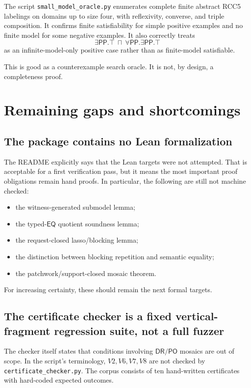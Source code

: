 \documentclass[11pt]{article}
\newcommand{\PP}{\mathsf{PP}}
\newcommand{\PO}{\mathsf{PO}}
\newcommand{\DR}{\mathsf{DR}}
\newcommand{\EQ}{\mathsf{EQ}}
\newcommand{\true}{\top}
\begin{document}
The script \texttt{small\_model\_oracle.py} enumerates complete finite abstract RCC5 labelings on domains up to size four, with reflexivity, converse, and triple composition.  It confirms finite satisfiability for simple positive examples and no finite model for some negative examples.  It also correctly treats
\[
\exists\PP.\true\ \sqcap\ \forall\PP.\exists\PP.\true
\]
as an infinite-model-only positive case rather than as finite-model satisfiable.

This is good as a counterexample search oracle.  It is not, by design, a completeness proof.

\section{Remaining gaps and shortcomings}

\subsection{The package contains no Lean formalization}

The README explicitly says that the Lean targets were not attempted.  That is acceptable for a first verification pass, but it means the most important proof obligations remain hand proofs.  In particular, the following are still not machine checked:
\begin{itemize}
\item the witness-generated submodel lemma;
\item the typed-\(\EQ\) quotient soundness lemma;
\item the request-closed lasso/blocking lemma;
\item the distinction between blocking repetition and semantic equality;
\item the patchwork/support-closed mosaic theorem.
\end{itemize}

For increasing certainty, these should remain the next formal targets.

\subsection{The certificate checker is a fixed vertical-fragment regression suite, not a full fuzzer}

The checker itself states that conditions involving \(\DR/\PO\) mosaics are out of scope.  In the script's terminology, \(V2,V6,V7,V8\) are not checked by \texttt{certificate\_checker.py}.  The corpus consists of ten hand-written certificates with hard-coded expected outcomes.
\end{document}
